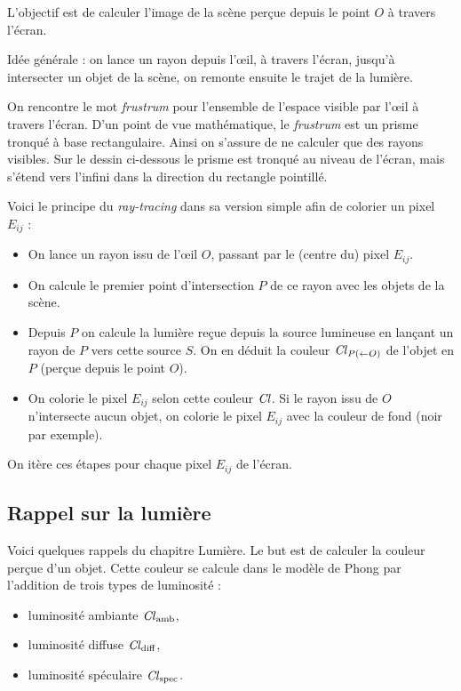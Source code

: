 \documentclass[11pt,class=report,crop=false]{standalone}
\begin{document}

L'objectif est de calculer l'image de la scène perçue depuis le point $O$ à travers l'écran.

Idée générale : on lance un rayon depuis l'\oe il, à travers l'écran, jusqu'à intersecter un objet de la scène, on remonte ensuite le trajet de la lumière.



On rencontre le mot \emph{frustrum} pour l'ensemble de l'espace visible par l'\oe il à travers l'écran.
D'un point de vue mathématique, le \emph{frustrum} est un prisme tronqué à base rectangulaire. Ainsi on s'assure de ne calculer que des rayons visibles. Sur le dessin ci-dessous le prisme est tronqué au niveau de l'écran, mais s'étend vers l'infini dans la direction du rectangle pointillé.




Voici le principe du \emph{ray-tracing} dans sa version simple afin de colorier un pixel $E_{ij}$ :
\begin{itemize}
	\item On lance un rayon issu de l'\oe il $O$, passant par le (centre du) pixel $E_{ij}$.
	\item On calcule le premier point d'intersection $P$ de ce rayon avec les objets de la scène.
	\item Depuis $P$ on calcule la lumière reçue depuis la source lumineuse en lançant un rayon de $P$ vers cette source $S$. On en déduit la couleur $\operatorname{\it Cl}_{P(\leftarrow O)}$ de l'objet en $P$ (perçue depuis le point $O$).
	\item On colorie le pixel $E_{ij}$ selon cette couleur $\operatorname{\it Cl}$. 
	Si le rayon issu de $O$ n'intersecte aucun objet, on colorie le pixel $E_{ij}$ avec la couleur de fond (noir par exemple). 
\end{itemize}
On itère ces étapes pour chaque pixel $E_{ij}$ de l'écran.



\subsection{Rappel sur la lumière}

Voici quelques rappels du chapitre \og{}Lumière\fg{}.
Le but est de calculer la couleur perçue d'un objet.
Cette couleur se calcule dans le modèle de Phong par l'addition de trois types de luminosité :
\begin{itemize}
	\item luminosité ambiante $\operatorname{\it Cl}_{\text{amb}}$,
	\item luminosité diffuse $\operatorname{\it Cl}_{\text{diff}}$,
	\item luminosité spéculaire $\operatorname{\it Cl}_{\text{spec}}$.
\end{itemize}
\end{document}
